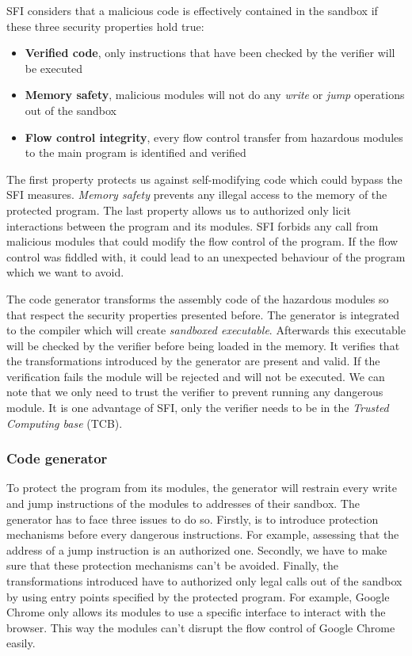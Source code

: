 \documentclass[11pt]{sdm}
\begin{document}
SFI considers that a malicious code is effectively contained in the sandbox if these three security properties hold true:
\begin{itemize}
	\item \textbf{Verified code}, only instructions that have been checked by the verifier will be executed 
	\item \textbf{Memory safety}, malicious modules will not do any \textit{write} or \textit{jump} operations out of the sandbox
	\item \textbf{Flow control integrity}, every flow control transfer from hazardous modules to the main program is identified and verified
\end{itemize}
The first property protects us against self-modifying code which could bypass the SFI measures. \textit{Memory safety} prevents any illegal access to the memory of the protected program. The last property allows us to authorized only licit interactions between the program and its modules. SFI forbids any call from malicious modules that could modify the flow control of the program. If the flow control was fiddled with, it could lead to an unexpected behaviour of the program which we want to avoid.

The code generator transforms the assembly code of the hazardous modules so that respect the security properties presented before. The generator is integrated to the compiler which will create \textit{sandboxed executable}. Afterwards this executable will be checked by the verifier before being loaded in the memory. 
It verifies that the transformations introduced by the generator are present and valid. If the verification fails the module will be rejected and will not be executed. We can note that we only need to trust the verifier to prevent running any dangerous module. It is one advantage of SFI, only the verifier needs to be in the \textit{Trusted Computing base} (TCB).


\subsubsection{Code generator}
\label{ssub:Code generator}
To protect the program from its modules, the generator will restrain every write and jump instructions of the modules to addresses of their sandbox.
The generator has to face three issues to do so. Firstly, is to introduce protection mechanisms before every dangerous instructions. For example, assessing that the address of a jump instruction is an authorized one.
Secondly, we have to make sure that these protection mechanisms can't be avoided. 
Finally, the transformations introduced have to authorized only legal calls out of the sandbox by using entry points specified by the protected program. For example, Google Chrome only allows its modules to use a specific interface to interact with the browser. This way the modules can't disrupt the flow control of Google Chrome easily.
\end{document}
